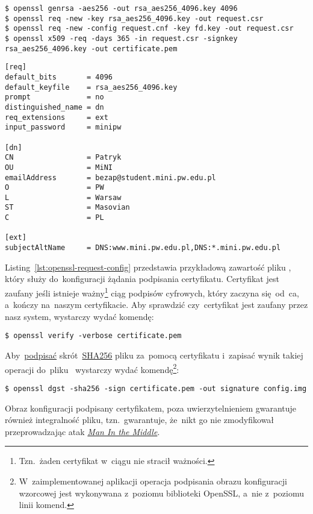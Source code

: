 \documentclass[thesis]{subfiles}
\begin{document}
\begin{lstlisting}[numbers=none,caption={Wygenerowanie i~podpisanie certyfikatu X.509},label=lst:openssl-gencert]
$ openssl genrsa -aes256 -out rsa_aes256_4096.key 4096
$ openssl req -new -key rsa_aes256_4096.key -out request.csr
$ openssl req -new -config request.cnf -key fd.key -out request.csr
$ openssl x509 -req -days 365 -in request.csr -signkey rsa_aes256_4096.key -out certificate.pem
\end{lstlisting}

\begin{lstlisting}[numbers=none,caption={Plik z~konfiguracją certyfikatu X.509},label=lst:openssl-request-config]
[req]
default_bits       = 4096
default_keyfile    = rsa_aes256_4096.key
prompt             = no
distinguished_name = dn
req_extensions     = ext
input_password     = minipw

[dn]
CN                 = Patryk
OU                 = MiNI
emailAddress       = bezap@student.mini.pw.edu.pl
O                  = PW
L                  = Warsaw
ST                 = Masovian
C                  = PL

[ext]
subjectAltName     = DNS:www.mini.pw.edu.pl,DNS:*.mini.pw.edu.pl
\end{lstlisting}

Listing~\ref{lst:openssl-request-config} przedstawia przykładową zawartość pliku , który służy do~konfiguracji żądania podpisania certyfikatu. Certyfikat jest zaufany jeśli istnieje ważny\footnote{Tzn.~żaden certyfikat w~ciągu nie stracił ważności.} ciąg podpisów cyfrowych, który zaczyna się~od~\gls{ca}, a~kończy na~naszym certyfikacie. Aby sprawdzić czy~certyfikat jest zaufany przez nasz system, wystarczy wydać komendę:
\begin{lstlisting}[numbers=none,frame=none]
$ openssl verify -verbose certificate.pem
\end{lstlisting}

Aby~\href{http://stackoverflow.com/questions/10782826/digital-signature-for-a-file-using-openssl}{podpisać} skrót~\href{https://en.wikipedia.org/wiki/SHA-2}{SHA256} pliku  za~pomocą certyfikatu  i~zapisać wynik takiej operacji do~pliku~ wystarczy wydać komendę\footnote{W~zaimplementowanej aplikacji operacja podpisania obrazu konfiguracji wzorcowej jest wykonywana z~poziomu biblioteki OpenSSL, a~nie z~poziomu linii komend.}:

\begin{lstlisting}[numbers=none,frame=none]
$ openssl dgst -sha256 -sign certificate.pem -out signature config.img
\end{lstlisting}

Obraz konfiguracji podpisany certyfikatem, poza uwierzytelnieniem gwarantuje również integralność pliku, tzn.~gwarantuje, że~nikt go nie zmodyfikował przeprowadzając atak \emph{\hyperlink{itm:mitm}{Man In the Middle}}.
\end{document}
